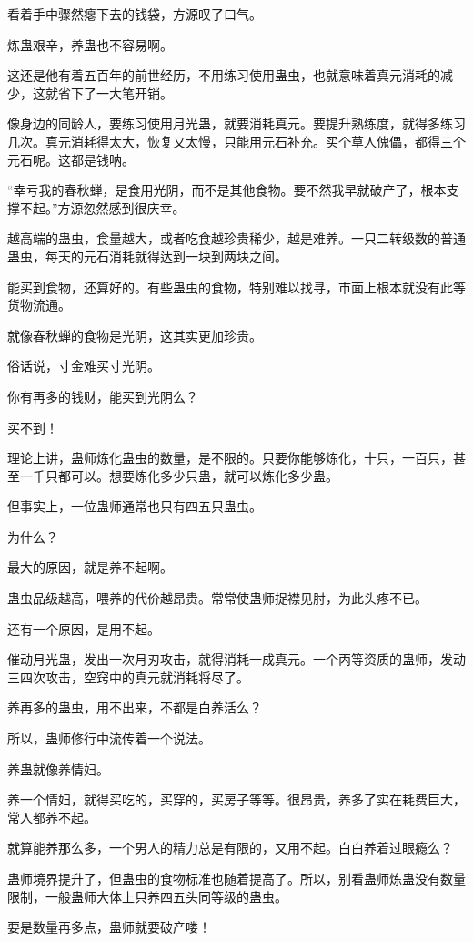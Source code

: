\begin{this_body}
看着手中骤然瘪下去的钱袋，方源叹了口气。

炼蛊艰辛，养蛊也不容易啊。

这还是他有着五百年的前世经历，不用练习使用蛊虫，也就意味着真元消耗的减少，这就省下了一大笔开销。

像身边的同龄人，要练习使用月光蛊，就要消耗真元。要提升熟练度，就得多练习几次。真元消耗得太大，恢复又太慢，只能用元石补充。买个草人傀儡，都得三个元石呢。这都是钱呐。

“幸亏我的春秋蝉，是食用光阴，而不是其他食物。要不然我早就破产了，根本支撑不起。”方源忽然感到很庆幸。

越高端的蛊虫，食量越大，或者吃食越珍贵稀少，越是难养。一只二转级数的普通蛊虫，每天的元石消耗就得达到一块到两块之间。

能买到食物，还算好的。有些蛊虫的食物，特别难以找寻，市面上根本就没有此等货物流通。

就像春秋蝉的食物是光阴，这其实更加珍贵。

俗话说，寸金难买寸光阴。

你有再多的钱财，能买到光阴么？

买不到！

理论上讲，蛊师炼化蛊虫的数量，是不限的。只要你能够炼化，十只，一百只，甚至一千只都可以。想要炼化多少只蛊，就可以炼化多少蛊。

但事实上，一位蛊师通常也只有四五只蛊虫。

为什么？

最大的原因，就是养不起啊。

蛊虫品级越高，喂养的代价越昂贵。常常使蛊师捉襟见肘，为此头疼不已。

还有一个原因，是用不起。

催动月光蛊，发出一次月刃攻击，就得消耗一成真元。一个丙等资质的蛊师，发动三四次攻击，空窍中的真元就消耗将尽了。

养再多的蛊虫，用不出来，不都是白养活么？

所以，蛊师修行中流传着一个说法。

养蛊就像养情妇。

养一个情妇，就得买吃的，买穿的，买房子等等。很昂贵，养多了实在耗费巨大，常人都养不起。

就算能养那么多，一个男人的精力总是有限的，又用不起。白白养着过眼瘾么？

蛊师境界提升了，但蛊虫的食物标准也随着提高了。所以，别看蛊师炼蛊没有数量限制，一般蛊师大体上只养四五头同等级的蛊虫。

要是数量再多点，蛊师就要破产喽！

\end{this_body}


